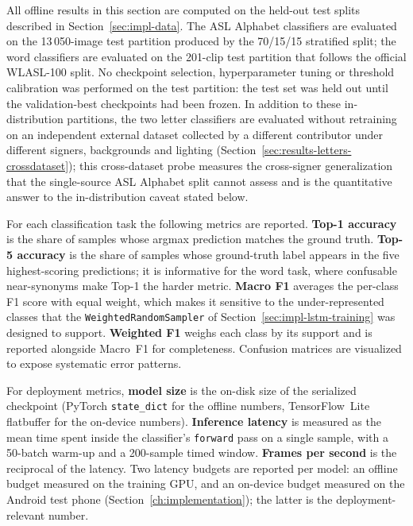 All offline results in this section are computed on the held-out test
splits described in Section~\ref{sec:impl-data}. The ASL Alphabet
classifiers are evaluated on the 13\,050-image test partition produced
by the 70/15/15 stratified split; the word classifiers are evaluated on
the 201-clip test partition that follows the official WLASL-100 split.
No checkpoint selection, hyperparameter tuning or threshold calibration
was performed on the test partition: the test set was held out until
the validation-best checkpoints had been frozen. In addition to these
in-distribution partitions, the two letter classifiers are evaluated
without retraining on an independent external dataset collected by a
different contributor under different signers, backgrounds and lighting
(Section~\ref{sec:results-letters-crossdataset}); this cross-dataset
probe measures the cross-signer generalization that the single-source
ASL Alphabet split cannot assess and is the quantitative answer to the
in-distribution caveat stated below.

For each classification task the following metrics are reported.
\textbf{Top-1 accuracy} is the share of samples whose argmax prediction
matches the ground truth. \textbf{Top-5 accuracy} is the share of
samples whose ground-truth label appears in the five highest-scoring
predictions; it is informative for the word task, where confusable
near-synonyms make Top-1 the harder metric. \textbf{Macro F1} averages
the per-class F1 score with equal weight, which makes it sensitive to
the under-represented classes that the
\texttt{WeightedRandomSampler} of Section~\ref{sec:impl-lstm-training}
was designed to support. \textbf{Weighted F1} weighs each class by its
support and is reported alongside Macro~F1 for completeness. Confusion
matrices are visualized to expose systematic error patterns.

For deployment metrics, \textbf{model size} is the on-disk size of the
serialized checkpoint (PyTorch \texttt{state\_dict} for the offline
numbers, TensorFlow~Lite flatbuffer for the on-device numbers).
\textbf{Inference latency} is measured as the mean time spent inside
the classifier's \texttt{forward} pass on a single sample, with a 50-batch
warm-up and a 200-sample timed window. \textbf{Frames per second} is
the reciprocal of the latency. Two latency budgets are reported per
model: an offline budget measured on the training GPU, and an
on-device budget measured on the Android test phone
(Section~\ref{ch:implementation}); the latter is the deployment-relevant
number.


